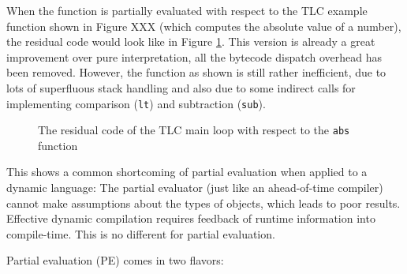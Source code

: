 When the function is partially evaluated with respect to the TLC example
function shown in Figure XXX (which computes the absolute value of a number),
the residual code would look like in Figure \ref{fig:tlc-folded}. This version
is already a great improvement over pure interpretation, all the bytecode
dispatch overhead has been removed. However, the function as shown is still
rather inefficient, due to lots of superfluous stack handling and also due to
some indirect calls for implementing comparison (\lstinline{lt}) and
subtraction (\lstinline{sub}).

\begin{figure}[h]
\begin{center}

\caption{The residual code of the TLC main loop with respect to the
\lstinline{abs} function }
\label{fig:tlc-folded}
\end{center}
\end{figure}

This shows a common shortcoming of partial evaluation when applied to a dynamic
language: The partial evaluator (just like an ahead-of-time compiler) cannot
make assumptions about the types of objects, which leads to poor results.
Effective dynamic compilation requires feedback of runtime information into
compile-time. This is no different for partial evaluation.

Partial evaluation (PE) comes in two flavors: 


